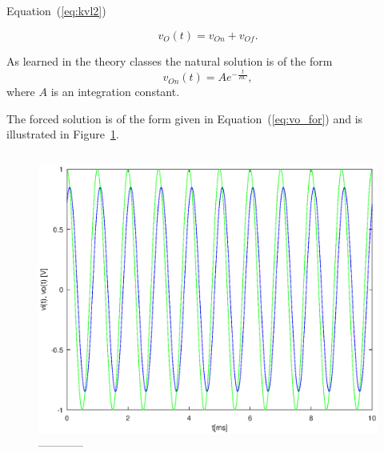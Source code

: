 Equation~(\ref{eq:kvl2}) 

\begin{equation}
  v_O(t) = v_{On} + v_{Of}.
  \label{eq:vo_sol}
\end{equation}

As learned in the theory classes the natural solution is of the form
\begin{equation}
  v_{On}(t) = Ae^{-\frac{t}{RC}},
  \label{eq:vo_nat}
\end{equation}
where $A$ is an integration constant.

The forced solution is of the form given in Equation~(\ref{eq:vo_for}) and is
illustrated in Figure~\ref{fig:forced}.

\begin{equation}
  
  \label{eq:vo_for}
\end{equation}

\begin{figure}[h] \centering
\includegraphics[width=0.8\linewidth]{forced.eps}
\caption{------------}
\label{fig:forced}
\end{figure}
